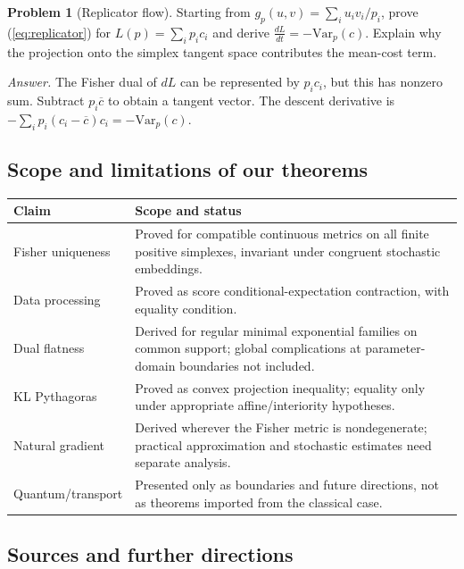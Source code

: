 \documentclass[11pt]{article}
\theoremstyle{definition}\newtheorem{definition}[theorem]{Definition}\newtheorem{exercise}{Problem}[section]
\begin{document}
\begin{exercise}[Replicator flow]
Starting from $g_p(u,v)=\sum_i u_iv_i/p_i$, prove (\ref{eq:replicator}) for $L(p)=\sum_i p_ic_i$ and derive $\frac{dL}{dt}=-\mathrm{Var}_p(c)$. Explain why the projection onto the simplex tangent space contributes the mean-cost term.
\end{exercise}
\emph{Answer.} The Fisher dual of $dL$ can be represented by $p_ic_i$, but this has nonzero sum. Subtract $p_i\overline c$ to obtain a tangent vector. The descent derivative is $-\sum_i p_i(c_i-\overline c)c_i=-\mathrm{Var}_p(c)$.

\subsection{Scope and limitations of our theorems}

\begin{tabular}{p{.25\linewidth}p{.64\linewidth}}
\toprule
\textbf{Claim} & \textbf{Scope and status}\\\midrule
Fisher uniqueness & Proved for compatible continuous metrics on all finite positive simplexes, invariant under congruent stochastic embeddings.\\
Data processing & Proved as score conditional-expectation contraction, with equality condition.\\
Dual flatness & Derived for regular minimal exponential families on common support; global complications at parameter-domain boundaries not included.\\
KL Pythagoras & Proved as convex projection inequality; equality only under appropriate affine/interiority hypotheses.\\
Natural gradient & Derived wherever the Fisher metric is nondegenerate; practical approximation and stochastic estimates need separate analysis.\\
Quantum/transport & Presented only as boundaries and future directions, not as theorems imported from the classical case.\\
\bottomrule
\end{tabular}

\subsection{Sources and further directions}
\end{document}
